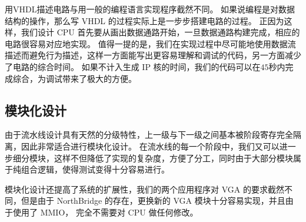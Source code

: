 \documentclass{article}
\begin{document}
用VHDL描述电路与用一般的编程语言实现程序截然不同。
如果说编程是对数据结构的操作，那么写 VHDL 的过程实际上是一步步搭建电路的过程。
正因为这样，我们设计 CPU 首先要从画出数据通路开始，一旦数据通路构建完成，相应的电路很容易对应地实现。
值得一提的是，我们在实现过程中尽可能地使用数据流描述而避免行为描述，这样一方面能写出更容易理解和调试的代码，另一方面减少了电路的综合时间。
如果不计入生成 IP 核的时间，我们的代码可以在$45$秒内完成综合，为调试带来了极大的方便。

\subsection{模块化设计}

由于流水线设计具有天然的分级特性，上一级与下一级之间基本被阶段寄存完全隔离，因此非常适合进行模块化设计。
在流水线的每一个阶段中，我们又可以进一步细分模块，这样不但降低了实现的复杂度，方便了分工，同时由于大部分模块属于纯组合逻辑，使得测试变得十分容易进行。

模块化设计还提高了系统的扩展性，我们的两个应用程序对 VGA 的要求截然不同，但是由于 NorthBridge 的存在，更换新的 VGA 模块十分容易实现，并且由于使用了 MMIO， 完全不需要对 CPU 做任何修改。
\end{document}
